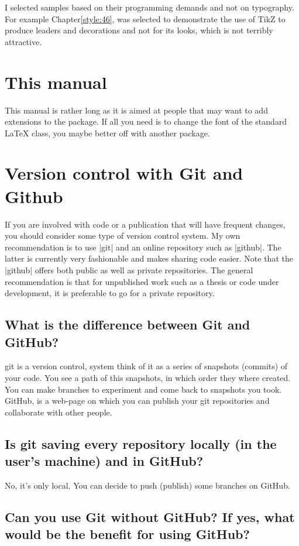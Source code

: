 I selected samples based on their programming demands and not on  typography. For example Chapter\ref{style:46}, was selected to demonstrate the use of TikZ to produce leaders and decorations and not for its looks, which is not terribly attractive.

\section{This manual}

This manual is rather long as it is aimed at people that may want to add extensions to the package. If all you need is to change the font of the standard LaTeX class, you maybe better off with another package. 

 \section{Version control with Git and Github}
 If you are involved with code or a publication that will have frequent changes, you should consider
 some type of version control system. My own recommendation is to use |git| and an online repository such
 as |github|. The latter is currently very fashionable and makes sharing code easier. Note that the |github|
 offers both public as well as private repositories. The general recommendation is that for unpublished work
 such as a thesis or code under development, it is preferable to go for a private repository. 
 
 \subsection*{What is the difference between Git and GitHub?}
git is a version control, system think of it as a series of snapshots (commits) of your code. You see 
a path of this snapshots, in which order they where created. You can make branches to experiment and come back to snapshots you took.
GitHub, is a web-page on which you can publish your git repositories and collaborate with other people.

 \subsection*{Is git saving every repository locally (in the user's machine) and in GitHub?}

 No, it's only local. You can decide to push (publish) some branches on GitHub.

 \subsection*{Can you use Git without GitHub? If yes, what would be the benefit for using GitHub?}

